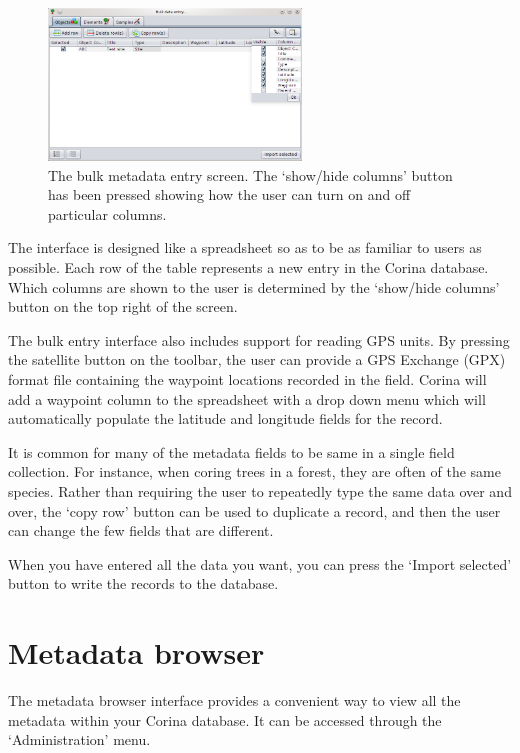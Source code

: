 \begin{figure}
\centering
\includegraphics[width=0.6\textwidth]{Images/bulkentry.png}
\caption{The bulk metadata entry screen.  The `show/hide columns' button has been pressed showing how the user can turn on and off particular columns.} 
\label{fig:bulkentry}
\end{figure}

The interface is designed like a spreadsheet so as to be as familiar to users as possible.  Each row of the table represents a new entry in the Corina database.  Which columns are shown to the user is determined by the `show/hide columns' button on the top right of the screen.  

The bulk entry interface also includes support for reading GPS units.  By pressing the satellite button on the toolbar, the user can provide a GPS Exchange (GPX) format file containing the waypoint locations recorded in the field.   Corina will add a waypoint column to the spreadsheet with a drop down menu which will automatically populate the latitude and longitude fields for the record. 

It is common for many of the metadata fields to be same in a single field collection.  For instance, when coring trees in a forest, they are often of the same species.  Rather than requiring the user to repeatedly type the same data over and over, the `copy row' button can be used to duplicate a record, and then the user can change the few fields that are different.

When you have entered all the data you want, you can press the `Import selected' button to write the records to the database.  

\section{Metadata browser}

The metadata browser interface provides a convenient way to view all the metadata within your Corina database.  It can be accessed through the `Administration' menu.

